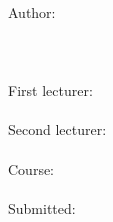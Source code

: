 \begin{titlepage}
    \begin{figure}
        \hfill
        \subfigure{\documentLogo}
    \end{figure}
    \begin{center}
        \documentType\\
        \Huge\documentTitle\normalsize\\
        \Large\documentSubTitle\normalsize\\
        Author:\\
        \documentAuthor\\
        \documentAuthorStreet\\
        \documentAuthorPostalcode \documentAuthorCity\\
        First lecturer:\\
        \documentFirstValidator\\
        Second lecturer:\\
        \documentSecondValidator\\
        Course:\\
        \documentUniCourse\\
        Submitted:\\
        \documentDate\\
    \end{center}
\end{titlepage}
